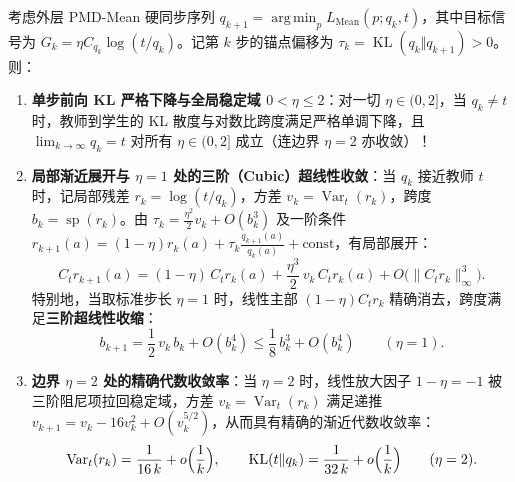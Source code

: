\documentclass[lang=cn,scheme=chinese,openany]{../book/elegantbook}
\newcommand{\KL}{\operatorname{KL}}
\newcommand{\Var}{\operatorname{Var}}
\DeclareMathOperator*{\argmin}{arg\,min}
\begin{document}
\begin{theorem}[PMD-Mean 硬同步的全局稳定域 $0<\eta\le 2$、$\eta=1$ 三阶收敛与 $\eta=2$ 边界速率]
\label{dyn:thm:mean-hard-sync-full-stability}
\label{dyn:prop:mean-opd-kl-descent}
\label{dyn:prop:mean-hard-sync-cubic-span}
\label{dyn:thm:mean-hard-sync-local-expansion}
\label{dyn:thm:mean-hard-sync-boundary-rate}
考虑外层 PMD-Mean 硬同步序列 $q_{k+1}=\argmin_{p} L_{\mathrm{Mean}}(p;q_k,t)$，其中目标信号为 $G_k=\eta C_{q_k}\log(t/q_k)$。记第 $k$ 步的锚点偏移为 $\tau_k=\KL(q_k\Vert q_{k+1})>0$。则：
\begin{enumerate}
 \item \textbf{单步前向 KL 严格下降与全局稳定域 $0<\eta\le 2$}：对一切 $\eta\in(0,2]$，当 $q_k\ne t$ 时，教师到学生的 KL 散度与对数比跨度满足严格单调下降，且 $\lim_{k\to\infty} q_k=t$ 对所有 $\eta\in(0,2]$ 成立（连边界 $\eta=2$ 亦收敛）！
 \item \textbf{局部渐近展开与 $\eta=1$ 处的三阶（Cubic）超线性收敛}：当 $q_k$ 接近教师 $t$ 时，记局部残差 $r_k=\log(t/q_k)$，方差 $v_k=\Var_t(r_k)$，跨度 $b_k=\operatorname{sp}(r_k)$。由 $\tau_k=\frac{\eta^2}{2}v_k+O(b_k^3)$ 及一阶条件 $r_{k+1}(a)=(1-\eta)r_k(a)+\tau_k\frac{q_{k+1}(a)}{q_k(a)}+\text{const}$，有局部展开：
 \begin{equation}
  C_t r_{k+1}(a) = (1-\eta)\,C_t r_k(a) + \frac{\eta^3}{2}\,v_k\,C_t r_k(a) + O\bigl(\|C_t r_k\|_\infty^3\bigr).
  \label{eq:mean-local-cubic-expansion}
 \end{equation}
 特别地，当取标准步长 \textbf{$\eta=1$} 时，线性主部 $(1-\eta)C_t r_k$ 精确消去，跨度满足\textbf{三阶超线性收缩}：
 \begin{equation}
  b_{k+1} = \frac{1}{2}\,v_k\,b_k + O(b_k^4) \le \frac{1}{8}\,b_k^3 + O(b_k^4)\qquad (\eta=1).
  \label{eq:mean-eta1-cubic-rate}
 \end{equation}
 \item \textbf{边界 $\eta=2$ 处的精确代数收敛率}：当 $\eta=2$ 时，线性放大因子 $1-\eta=-1$ 被三阶阻尼项拉回稳定域，方差 $v_k=\Var_t(r_k)$ 满足递推 $v_{k+1}=v_k - 16 v_k^2 + O(v_k^{5/2})$，从而具有精确的渐近代数收敛率：
 \begin{equation}
  \Var_t(r_k) = \frac{1}{16\,k} + o\Bigl(\frac{1}{k}\Bigr),
  \qquad
  \KL(t\Vert q_k) = \frac{1}{32\,k} + o\Bigl(\frac{1}{k}\Bigr)\qquad (\eta=2).
  \label{eq:mean-eta2-boundary-rate}
 \end{equation}
\end{enumerate}
\end{theorem}
\end{document}
